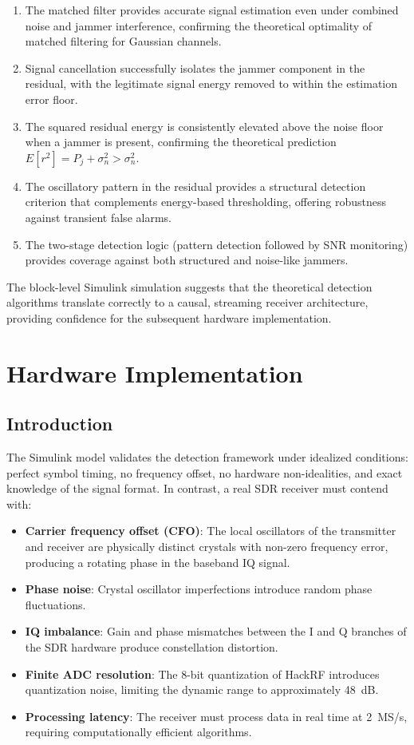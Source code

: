 \documentclass{article}
\begin{document}
\begin{enumerate}
\item The matched filter provides accurate signal estimation even under combined noise and jammer interference, confirming the theoretical optimality of matched filtering for Gaussian channels.
\item Signal cancellation successfully isolates the jammer component in the residual, with the legitimate signal energy removed to within the estimation error floor.
\item The squared residual energy is consistently elevated above the noise floor when a jammer is present, confirming the theoretical prediction $E[r^2] = P_j + \sigma_n^2 > \sigma_n^2$.
\item The oscillatory pattern in the residual provides a structural detection criterion that complements energy-based thresholding, offering robustness against transient false alarms.
\item The two-stage detection logic (pattern detection followed by SNR monitoring) provides coverage against both structured and noise-like jammers.
\end{enumerate}

The block-level Simulink simulation suggests that the theoretical detection algorithms translate correctly to a causal, streaming receiver architecture, providing confidence for the subsequent hardware implementation.


\section{Hardware Implementation}

\subsection{Introduction}

The Simulink model validates the detection framework under idealized conditions: perfect symbol timing, no frequency offset, no hardware non-idealities, and exact knowledge of the signal format. In contrast, a real SDR receiver must contend with:

\begin{itemize}
\item \textbf{Carrier frequency offset (CFO)}: The local oscillators of the transmitter and receiver are physically distinct crystals with non-zero frequency error, producing a rotating phase in the baseband IQ signal.
\item \textbf{Phase noise}: Crystal oscillator imperfections introduce random phase fluctuations.
\item \textbf{IQ imbalance}: Gain and phase mismatches between the I and Q branches of the SDR hardware produce constellation distortion.
\item \textbf{Finite ADC resolution}: The 8-bit quantization of HackRF introduces quantization noise, limiting the dynamic range to approximately 48~dB.
\item \textbf{Processing latency}: The receiver must process data in real time at 2~MS/s, requiring computationally efficient algorithms.
\end{itemize}
\end{document}
